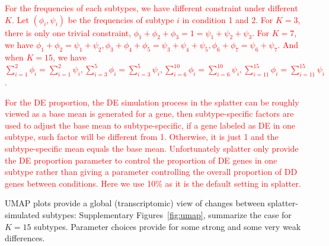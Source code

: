 \documentclass[aoas,preprint]{imsart}
\begin{document}
\textcolor{red}{For the frequencies of each subtypes, we have different constraint under different $K$. 
Let $(\phi_i,\psi_i)$ be the frequencies of subtype $i$ in condition 1 and 2.
For $K = 3$, there is only one trivial constraint, $\phi_1 + \phi_2 + \phi_3 = 1 = \psi_1 + \psi_2 + \psi_3$.
For $K = 7$, we have $\phi_1 + \phi_2 = \psi_1 + \psi_2, \phi_3 + \phi_4 + \phi_5 = \psi_3 + \psi_4 + \psi_5, \phi_6 + \phi_7 = \psi_6 + \psi_7$.
And when $K = 15$, we have $\sum_{i = 1}^2 \phi_i = \sum_{i = 1}^2 \psi_i,\sum_{i = 3}^5 \phi_i = \sum_{i = 3}^5 \psi_i,
\sum_{i = 6}^{10} \phi_i = \sum_{i = 6}^{10} \psi_i,\sum_{i = 11}^{15} \phi_i = \sum_{i = 11}^{15} \psi_i$.}

\textcolor{red}{For the DE proportion, the DE simulation process in the splatter can be roughly viewed as a base mean is generated for a gene, then subtype-specific factors are used to adjust the base mean to subtype-specific, if a gene labeled as DE in one subtype, such factor will be different from 1. Otherwise, it is just 1 and the subtype-specific mean equals the base mean. 
Unfortunately splatter only provide the DE proportion parameter to control the proportion of DE genes in one subtype rather than giving a parameter controlling the overall proportion of DD genes between conditions.
Here we use 10\% as it is the default setting in splatter.}
 
UMAP plots  provide a global (transcriptomic) view of 
 changes between splatter-simulated subtypes:  Supplementary Figures~\ref{fig:umap}, summarize the case for $K=15$ subtypes.  Parameter choices provide for some
strong and some very weak differences.  




\end{document}
